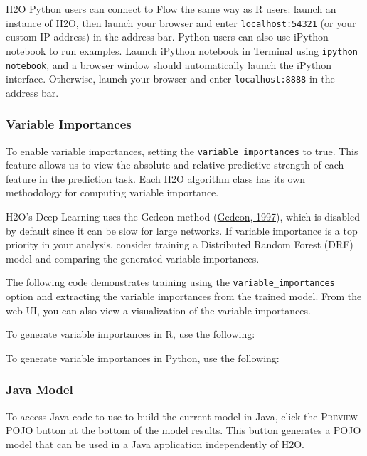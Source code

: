 {{H2O Python users can connect to Flow the same way as R users: launch an instance of H2O, then launch your browser and enter \texttt{localhost:54321} (or your custom IP address) in the address bar. Python users can also use iPython notebook to run examples. Launch iPython notebook in Terminal using \texttt{ipython notebook}, and a browser window should automatically launch the iPython interface. Otherwise, launch your browser and enter \texttt{localhost:8888} in the address bar. 

\subsubsection{Variable Importances} 

To enable variable importances, setting the \texttt{variable\_importances} to true. This feature allows us to view the absolute and relative predictive strength of each feature in the prediction task.  Each H2O algorithm class has its own methodology for computing variable importance.  

H2O's Deep Learning uses the Gedeon method (\href{http://cs.anu.edu.au/people/Tom.Gedeon/pdfs/ContribDataMinv2.pdf}{Gedeon, 1997}), which is disabled by default since it can be slow for large networks.  If variable importance is a top priority in your analysis, consider training a Distributed Random Forest (DRF) model and comparing the generated variable importances.

The following code demonstrates training using the \texttt{variable\_importances} option and extracting the variable importances from the trained model.  From the web UI, you can also view a visualization of the variable importances.

\waterExampleInR
To generate variable importances in R, use the following: 



\waterExampleInPython
To generate variable importances in Python, use the following: 


\subsubsection{Java Model} 

To access Java code to use to build the current model in Java, click the \textsc{Preview POJO} button at the
bottom of the model results. This button generates a POJO model that can be used in a Java application independently of H2O. 

}}
